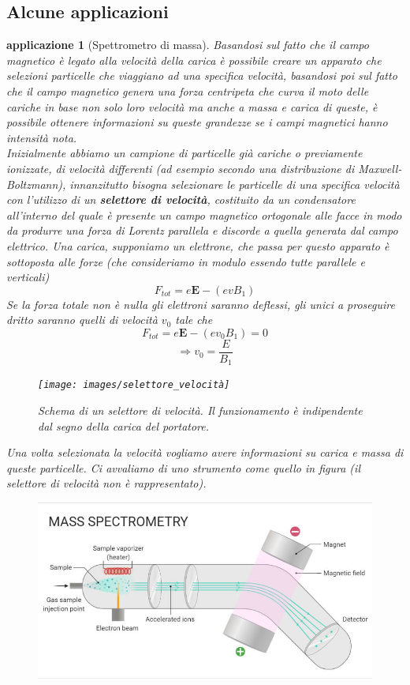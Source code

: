 \documentclass[10pt,a4paper]{article}
\newtheorem{applicazione}{applicazione}
\begin{document}
\subsection{Alcune applicazioni}
\begin{applicazione}[Spettrometro di massa]
Basandosi sul fatto che il campo magnetico è legato alla velocità della carica è possibile creare un apparato che selezioni particelle che viaggiano ad una specifica velocità, basandosi poi sul fatto che il campo magnetico genera una forza centripeta che curva il moto delle cariche in base non solo loro velocità ma anche a massa e carica di queste, è possibile ottenere informazioni su queste grandezze se i campi magnetici hanno intensità nota.\\
Inizialmente abbiamo un campione di particelle già cariche o previamente ionizzate, di velocità differenti (ad esempio secondo una distribuzione di Maxwell-Boltzmann), innanzitutto bisogna selezionare le particelle di una specifica velocità con l'utilizzo di un \textbf{selettore di velocità}, costituito da un condensatore all'interno del quale è presente un campo magnetico ortogonale alle facce in modo da produrre una forza di Lorentz  parallela e discorde a quella generata dal campo elettrico. Una carica, supponiamo un elettrone, che passa per questo apparato è sottoposta alle forze (che consideriamo in modulo essendo tutte parallele e verticali)
\[F_{tot} = e\mathbf{E}-(evB_1)\]
Se la forza totale non è nulla gli elettroni saranno deflessi, gli unici a proseguire dritto saranno quelli di velocità \(v_0\) tale che
\[F_{tot}= e\mathbf{E}-(ev_0B_1)=0\]
\[\Rightarrow v_0=\frac{E}{B_1}\]
\begin{figure}[h!]
	\centering
	\texttt{[image: images/selettore\_velocità]}
	\caption{Schema di un selettore di velocità. Il funzionamento è indipendente dal segno della carica del portatore.}
	\label{fig:selettorevelocita}
\end{figure}
\FloatBarrier
Una volta selezionata la velocità vogliamo avere informazioni su carica e massa di queste particelle. Ci avvaliamo di uno strumento come quello in figura (il selettore di velocità non è rappresentato).
\begin{figure}[h!]
	\centering
	\includegraphics[width=0.7\linewidth]{images/spettrometro}

\end{figure}
\end{applicazione}
\end{document}
